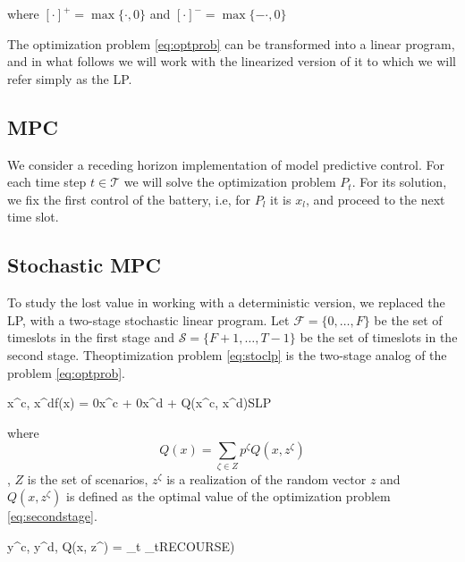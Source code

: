 \documentclass[11pt]{article}
\theoremstyle{definition}
\begin{document}
where $[\cdot]^+ = \max\{\cdot, 0\}$ and $[\cdot]^- = \max\{-\cdot, 0\}$

The optimization problem \eqref{eq:optprob} can be transformed into a linear program, and in what follows we will work with the linearized version of it to which we will refer simply as the LP.

\subsection{MPC}

We consider a receding horizon implementation of model predictive control. For each time step $t\in \mathcal{T}$ we will solve the optimization problem $P_t$. For its solution, we fix the first control of the battery, i.e, for $P_l$ it is $x_l$, and proceed to the next time slot. 


\subsection{Stochastic MPC}

To study the lost value in working with a deterministic version, we replaced the LP, with a two-stage stochastic linear program. Let $\mathcal{F} = \{0, \dots, F\}$ be the set of timeslots in the first stage and $\mathcal{S} = \{F+1, \dots, T-1 \}$ be the set of timeslots in the second stage. Theoptimization problem \eqref{eq:stoclp} is the two-stage analog of the problem \eqref{eq:optprob}.


\begin{mini!}[4]
	{x^c, x^d}{f(x) = 0x^c + 0x^d + Q(x^c, x^d)}{}{SLP}
  \label{eq:stoclp}
\end{mini!}


where $$Q(x) = \sum_{\zeta \in Z} p^\zeta Q(x, z^\zeta)$$, $Z$ is the set of scenarios, $z^\zeta$ is a realization of the random vector $z$ and $Q(x, z^\zeta)$ is defined as the optimal value of the optimization problem \eqref{eq:secondstage}.

\begin{mini!}[1]
	{y^c, y^d, \alpha}{Q(x, z^\zeta) = \sum_{t \in {}} \alpha_t}{}{RECOURSE)}
	\label{eq:secondstage}
\end{mini!}
\end{document}
